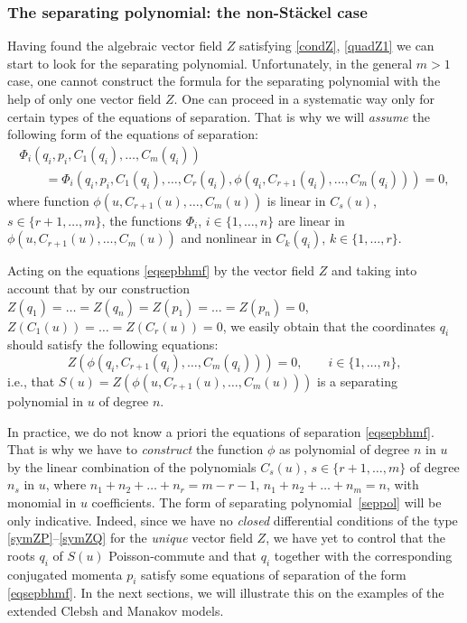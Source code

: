 \documentclass[pdftex]{sigma}
\numberwithin{equation}{section}
\begin{document}
\subsubsection{The separating polynomial: the non-St\"ackel case}
Having found the algebraic vector field $Z$ satisfying \eqref{condZ}, \eqref{quadZ1} we can start to look for the separating polynomial. Unfortunately, in the general $m>1$ case, one cannot construct the formula for the separating polynomial with the help of only one vector field $Z$. One can proceed in a systematic way only for certain types of the equations
of separation. That is why we will {\it assume} the following form of the equations of separation:
\begin{gather}
\Phi_{i}(q_i,p_i, C_1(q_i),\dots ,C_m(q_i))\nonumber\\
\qquad{} = \Phi_{i}(q_i,p_i, C_1(q_i),\dots ,C_r(q_i), \phi(q_i,C_{r+1}(q_i),\dots ,C_m(q_i)))
 =0,\label{eqsepbhmf}
\end{gather}
where function $\phi(u,C_{r+1}(u), \dots ,C_m(u))$ is linear in $C_{s}(u)$, $s\in \{r+1,\dots, m\}$, the functions $\Phi_{i}$, $i\in \{1, \dots,n \}$ are linear in $\phi(u,C_{r+1}(u), \dots ,C_m(u))$ and nonlinear in $C_k(q_i)$, $k\in \{1, \dots, r \}$.

Acting on the equations \eqref{eqsepbhmf} by the vector field $Z$ and taking into account that by our construction $Z(q_1)= \dots =Z(q_n)= Z(p_1)= \dots =Z(p_n)=0$, $Z(C_1(u))= \dots =Z(C_r(u))=0$,
we easily obtain that the coordinates $q_i$ should satisfy the following equations:
\begin{equation}\label{seppol}
Z(\phi(q_i,C_{r+1}(q_i), \dots ,C_m(q_i)))=0, \qquad i\in \{1, \dots, n\},
\end{equation}
i.e., that $S(u)=Z(\phi(u,C_{r+1}(u), \dots ,C_m(u)))$ is a separating polynomial in $u$ of degree $n$.

\begin{Remark}
In practice, we do not know a priori the equations of separation \eqref{eqsepbhmf}. That is why we have to {\it construct} the function $\phi$ as polynomial of degree $n$ in $u$ by the linear combination of the polynomials $C_{s}(u)$, $s\in \{r+1, \dots, m \}$ of degree $n_s$ in $u$, where
 $n_1+n_2+ \dots +n_r=m-r-1$, $n_1+n_2+ \dots +n_m=n$, with monomial in $u$ coefficients.
The form of separating polynomial~\eqref{seppol} will be only indicative. Indeed, since we have no {\it closed} differential conditions of the type \eqref{symZP}--\eqref{symZQ} for the {\it unique} vector field $Z$, we have yet to control that the roots $q_i$ of $S(u)$ Poisson-commute and that $q_i$ together with the corresponding conjugated momenta $p_i$ satisfy some equations of separation of the form \eqref{eqsepbhmf}. In the next sections, we will illustrate this on the examples of the extended Clebsh and Manakov models.
\end{Remark}
\end{document}
